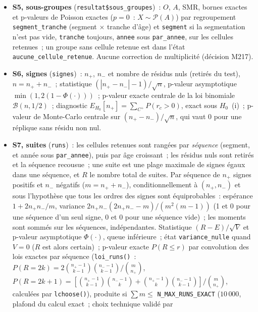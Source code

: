 \documentclass[a4paper,11pt]{article}
\newcommand{\code}[1]{\texttt{\small #1}}
\begin{document}
{\begin{itemize}[leftmargin=*, itemsep=2pt]
    (\code{docs/recherche/}\allowbreak\code{2026-11-05-sources-v1.md},
    §~4).
  \item \textbf{S5, sous-groupes} (\code{resultat\$sous\_groupes})~:
    $O$, $A$, SMR, bornes exactes et p-valeurs de Poisson exactes ($p = 0$~:
    $X \sim \mathcal{P}(A)$) par regroupement \code{segment\_tranche}
    (segment $\times$ tranche d'âge) et \code{segment} si la segmentation
    n'est pas vide, \code{tranche} toujours, \code{annee} sous
    \code{par\_annee}, sur les cellules retenues~; un groupe sans cellule
    retenue est dans l'état \code{aucune\_cellule\_retenue}. Aucune
    correction de multiplicité (décision M217).
  \item \textbf{S6, signes} (\code{signes})~: $n_{+}$, $n_{-}$ et
    nombre de résidus nuls (retirés du test), $n = n_{+} + n_{-}$~;
    statistique $(|n_{+} - n_{-}| - 1)/\sqrt{n}$, p-valeur asymptotique
    $\min(1, 2(1 - \Phi(\cdot)))$~; p-valeur exacte centrale de la loi
    binomiale $\mathcal{B}(n, 1/2)$~; diagnostic $E_{H_0}[n_{+}] =
    \sum_{C^{+}} P(r_c > 0)$, exact sous $H_0$~(i)~; p-valeur de
    Monte-Carlo centrale sur $(n_{+} - n_{-})/\sqrt{n}$, qui vaut 0 pour une
    réplique sans résidu non nul.
  \item \textbf{S7, suites} (\code{runs})~: les cellules retenues sont
    rangées par \emph{séquence} (segment, et année sous \code{par\_annee}),
    puis par âge croissant~; les résidus nuls sont retirés et la séquence
    recousue~; une suite est une plage maximale de signes égaux dans une
    séquence, et $R$ le nombre total de suites. Par séquence de $n_{+}$
    signes positifs et $n_{-}$ négatifs ($m = n_{+} + n_{-}$), conditionnellement
    à $(n_{+}, n_{-})$ et sous l'hypothèse que tous les ordres des signes sont
    équiprobables~: espérance $1 + 2n_{+}n_{-}/m$, variance $2n_{+}n_{-}(2n_{+}n_{-}
    - m)/(m^2(m-1))$ (1 et 0 pour une séquence d'un seul signe, 0 et 0 pour une
    séquence vide)~; les moments sont sommés sur les séquences,
    indépendantes. Statistique $(R - E)/\sqrt{V}$ et p-valeur asymptotique
    $\Phi(\cdot)$, queue inférieure~; état \code{variance\_nulle} quand
    $V = 0$ ($R$ est alors certain)~; p-valeur exacte $P(R \le r)$ par
    convolution des lois exactes par séquence (\code{loi\_runs()}~:
    $P(R = 2k) = 2\binom{n_{+}-1}{k-1}\binom{n_{-}-1}{k-1}/\binom{m}{n_{+}}$,
    $P(R = 2k+1) = [\binom{n_{+}-1}{k-1}\binom{n_{-}-1}{k} +
    \binom{n_{+}-1}{k}\binom{n_{-}-1}{k-1}]/\binom{m}{n_{+}}$, calculées par
    \code{lchoose()}), produite si $\sum m \le$ \code{N\_MAX\_RUNS\_EXACT}
    ($10\,000$, plafond du calcul exact~; choix technique validé par

\end{itemize}}
\end{document}
